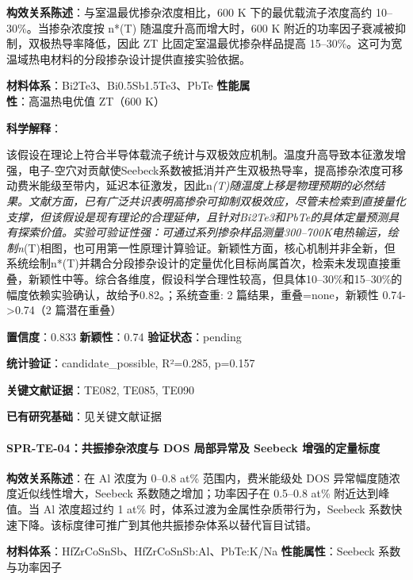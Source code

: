 \documentclass[12pt,a4paper]{ctexart}
\begin{document}
\textbf{构效关系陈述}：与室温最优掺杂浓度相比，600 K 下的最优载流子浓度高约 10--30\%。当掺杂浓度按 n*(T) 随温度升高而增大时，600 K 附近的功率因子衰减被抑制，双极热导率降低，因此 ZT 比固定室温最优掺杂样品提高 15--30\%。这可为宽温域热电材料的分段掺杂设计提供直接实验依据。

\textbf{材料体系}：Bi2Te3、Bi0.5Sb1.5Te3、PbTe \textbar{} \textbf{性能属性}：高温热电优值 ZT（600 K）

\textbf{科学解释}：

该假设在理论上符合半导体载流子统计与双极效应机制。温度升高导致本征激发增强，电子-空穴对贡献使Seebeck系数被抵消并产生双极热导率，提高掺杂浓度可移动费米能级至带内，延迟本征激发，因此n\emph{(T)随温度上移是物理预期的必然结果。文献方面，已有广泛共识表明高掺杂可抑制双极效应，尽管未检索到直接量化支撑，但该假设是现有理论的合理延伸，且针对Bi2Te3和PbTe的具体定量预测具有探索价值。实验可验证性强：可通过系列掺杂样品测量300--700K电热输运，绘制n}(T)相图，也可用第一性原理计算验证。新颖性方面，核心机制并非全新，但系统绘制n*(T)并耦合分段掺杂设计的定量优化目标尚属首次，检索未发现直接重叠，新颖性中等。综合各维度，假设科学合理性较高，但具体10--30\%和15--30\%的幅度依赖实验确认，故给予0.82。；系统查重: 2 篇结果，重叠=none，新颖性 0.74-\textgreater0.74（2 篇潜在重叠）

\textbf{置信度}：0.833 \textbar{} \textbf{新颖性}：0.74 \textbar{} \textbf{验证状态}：pending

\textbf{统计验证}：candidate\_possible, R²=0.285, p=0.157

\textbf{关键文献证据}：TE082, TE085, TE090

\textbf{已有研究基础}：见关键文献证据

\paragraph{SPR-TE-04：共振掺杂浓度与 DOS 局部异常及 Seebeck 增强的定量标度}\label{spr-te-04ux5171ux632fux63baux6742ux6d53ux5ea6ux4e0e-dos-ux5c40ux90e8ux5f02ux5e38ux53ca-seebeck-ux589eux5f3aux7684ux5b9aux91cfux6807ux5ea6}

\textbf{构效关系陈述}：在 Al 浓度为 0--0.8 at\% 范围内，费米能级处 DOS 异常幅度随浓度近似线性增大，Seebeck 系数随之增加；功率因子在 0.5--0.8 at\% 附近达到峰值。当 Al 浓度超过约 1 at\% 时，体系过渡为金属性杂质带行为，Seebeck 系数快速下降。该标度律可推广到其他共振掺杂体系以替代盲目试错。

\textbf{材料体系}：HfZrCoSnSb、HfZrCoSnSb:Al、PbTe:K/Na \textbar{} \textbf{性能属性}：Seebeck 系数与功率因子
\end{document}
